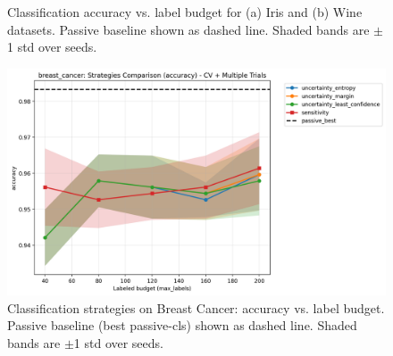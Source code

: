 \documentclass[conference]{IEEEtran}
\begin{document}
\begin{figure}[t]
\centering
{}
\hfill
{}
\caption{Classification accuracy vs. label budget for (a) Iris and (b) Wine datasets. Passive baseline shown as dashed line. Shaded bands are $\pm$1 std over seeds.}
\label{fig:iris-compare}
\end{figure}

\begin{figure}[t]
\centering
\includegraphics[width=0.95\columnwidth]{figures/cls_breast_cancer_comparison_accuracy.png}
\caption{Classification strategies on Breast Cancer: accuracy vs. label budget. Passive baseline (best passive-cls) shown as dashed line. Shaded bands are $\pm$1 std over seeds.}
\label{fig:breast-compare}
\end{figure}
\end{document}
